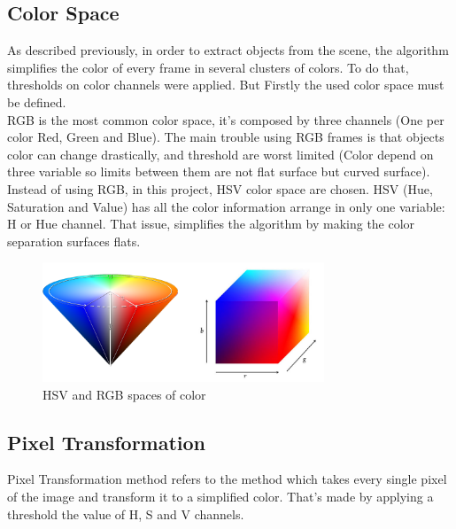 \subsection{Color Space}
As described previously, in order to extract objects from the scene, the algorithm simplifies the color of every frame in several clusters of colors. To do that, thresholds on color channels were applied. But Firstly the used color space must be defined. \\
RGB is the most common color space, it's composed by three channels (One per color Red, Green and Blue). The main trouble using RGB frames is that objects color can change drastically, and threshold are worst limited (Color depend on three variable so limits between them are not flat surface but curved surface).
Instead of using RGB, in this project, HSV color space are chosen. HSV (Hue, Saturation and Value) has all the color information arrange in only one variable: H or Hue channel. That issue, simplifies the algorithm by making the color separation surfaces flats.  \\

\begin{figure}
	\centering
	\includegraphics[width=0.75\textwidth,natwidth=944,natheight=400]{../Images/c1/HSV_vs_RGB.png}
	\caption{HSV and RGB spaces of color}
	\label{fig:HSV_vs_RGB}
\end{figure}

\subsection{Pixel Transformation}
Pixel Transformation method refers to the method which takes every single pixel of the image and transform it to a simplified color. That's made by applying a threshold the value of H, S and V channels. \\

